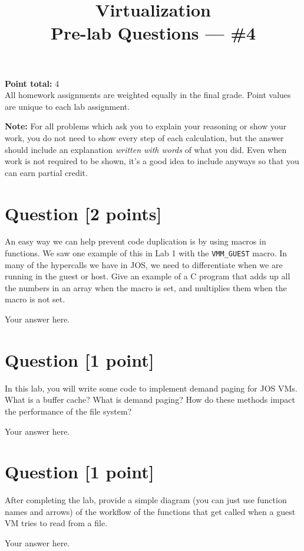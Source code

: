 \documentclass[11pt]{article}
\providecommand{\due}{}
\begin{document}
\title{Virtualization\\Pre-lab Questions --- \#4}
\date{\due}

\maketitle

\noindent \textbf{Point total:} 4
\\ All homework assignments are weighted equally in the final grade. Point values are unique to each lab assignment.

\textbf{Note:} For all problems which ask you to explain your reasoning or show your work, you do not need to show every step of each calculation, but the answer should include an explanation \emph{written with words} of what you did.  Even when work is not required to be shown, it’s a good idea to include anyways so that you can earn partial credit.

\section{Question [2 points]}

An easy way we can help prevent code duplication is by using macros in functions. We saw one example of this in Lab 1 with the \texttt{VMM\_GUEST} macro. In many of the hypercalls we have in JOS, we need to differentiate when we are running in the guest or host. Give an example of a C program that adds up all the numbers in an array when the macro is set, and multiplies them when the macro is not set.

\begin{solution}
Your answer here.
\end{solution}


\section{Question [1 point]}

In this lab, you will write some code to implement demand paging for JOS VMs. What is a buffer cache? What is demand paging? How do these methods impact the performance of the file system?

\begin{solution}
Your answer here.
\end{solution}


\section{Question [1 point]}

After completing the lab, provide a simple diagram (you can just use function names and arrows) of the workflow of the functions that get called when a guest VM tries to read from a file.

\begin{solution}
Your answer here.
\end{solution}
\end{document}
